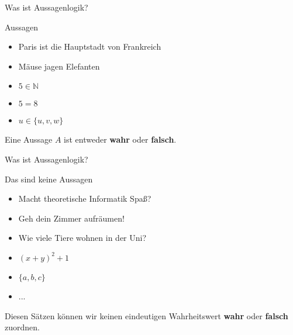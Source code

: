 %
%
%
%

\begin{frame}[fragile]{Was ist Aussagenlogik?}
    \begin{alertblock}{Aussagen}
    \begin{itemize}
        \item Paris ist die Hauptstadt von Frankreich
        \item Mäuse jagen Elefanten
        \item $5 \in \mathbb{N}$
        \item $5 = 8$
        \item $u \in \{u, v, w\}$
    \end{itemize}
    \end{alertblock}
    Eine Aussage $A$ ist entweder \textbf{wahr} oder \textbf{falsch}.
\end{frame}

\begin{frame}[fragile]{Was ist Aussagenlogik?}
    \begin{alertblock}{Das sind keine Aussagen}
    \begin{itemize}
        \item Macht theoretische Informatik Spaß?
        \item Geh dein Zimmer aufräumen!
        \item Wie viele Tiere wohnen in der Uni?
        \item $(x+y)^2+1$
        \item $\{a,b,c\}$
        \item ...
    \end{itemize}
    \end{alertblock}
    Diesen Sätzen können wir keinen eindeutigen Wahrheitswert \textbf{wahr} oder \textbf{falsch} zuordnen.
\end{frame}

